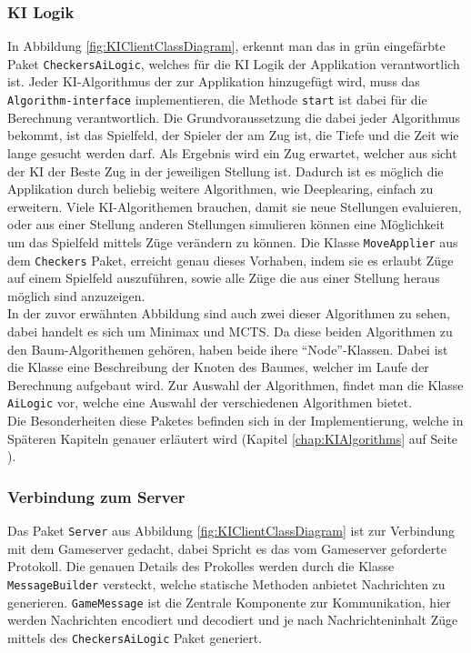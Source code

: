 \documentclass[12pt,a4paper,bibliography=totocnumbered,listof=totocnumbered]{article}
\begin{document}
\subsubsection{KI Logik}
In Abbildung \ref{fig:KIClientClassDiagram}, erkennt man das in grün eingefärbte Paket \texttt{CheckersAiLogic}, welches für die KI Logik der Applikation verantwortlich ist.
Jeder KI-Algorithmus der zur Applikation hinzugefügt wird, muss das \texttt{Algorithm-interface} implementieren, die Methode \texttt{start} ist dabei für die Berechnung 
verantwortlich. Die Grundvoraussetzung die dabei jeder Algorithmus bekommt, ist das Spielfeld, der Spieler der am Zug ist, die Tiefe und die Zeit wie lange gesucht werden darf.
Als Ergebnis wird ein Zug erwartet, welcher aus sicht der KI der Beste Zug in der jeweiligen Stellung ist. Dadurch ist es möglich die Applikation durch beliebig weitere 
Algorithmen, wie Deeplearing, einfach zu erweitern. 
Viele KI-Algorithemen brauchen, damit sie neue Stellungen evaluieren, oder aus einer Stellung anderen Stellungen simulieren können eine Möglichkeit um das Spielfeld mittels 
Züge verändern zu können. Die Klasse \texttt{MoveApplier} aus dem \texttt{Checkers} Paket, erreicht genau dieses Vorhaben, indem sie es erlaubt Züge auf einem Spielfeld auszuführen, 
sowie alle Züge die aus einer Stellung heraus möglich sind anzuzeigen.
\\
In der zuvor erwähnten Abbildung sind auch zwei dieser Algorithmen zu sehen, dabei handelt es sich um Minimax und MCTS. Da diese beiden Algorithmen zu den Baum-Algorithemen
gehören, haben beide ihere ``Node''-Klassen. Dabei ist die Klasse eine Beschreibung der Knoten des Baumes, welcher im Laufe der Berechnung aufgebaut wird.
Zur Auswahl der Algorithmen, findet man die Klasse \texttt{AiLogic} vor, welche eine Auswahl der verschiedenen Algorithmen bietet. 
\\ 
Die Besonderheiten diese Paketes befinden sich in der Implementierung, welche in Späteren Kapiteln genauer erläutert wird 
(Kapitel \ref{chap:KIAlgorithms} auf Seite \pageref{chap:KIAlgorithms}).

\subsubsection{Verbindung zum Server}
Das Paket \texttt{Server} aus Abbildung \ref{fig:KIClientClassDiagram} ist zur Verbindung mit dem Gameserver gedacht, dabei Spricht es das vom Gameserver geforderte 
Protokoll. Die genauen Details des Prokolles werden durch die Klasse \texttt{MessageBuilder} versteckt, welche statische Methoden anbietet Nachrichten zu generieren.
\texttt{GameMessage} ist die Zentrale Komponente zur Kommunikation, hier werden Nachrichten encodiert und decodiert und je nach Nachrichteninhalt 
Züge mittels des \texttt{CheckersAiLogic} Paket generiert.
\end{document}
